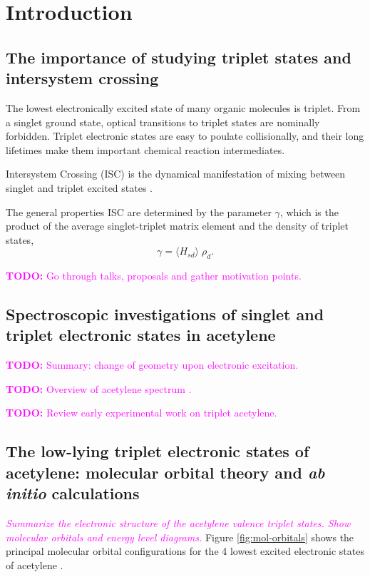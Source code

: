 \documentclass[12pt]{mitthesis}
\newcommand{\TODO} [1]{\textcolor{magenta}{\textbf{TODO:} #1}}
\newcommand{\POINT}[1]{\textcolor{magenta}{\emph{#1}}}
\begin{document}
\tableofcontents
\clearpage

\chapter{Introduction}
\label{chapter:intro}

\section{The importance of studying triplet states and intersystem
  crossing}

The lowest electronically excited state of many organic molecules is
triplet.  From a singlet ground state, optical transitions to triplet
states are nominally forbidden.  Triplet electronic states are easy to
poulate collisionally, and their long lifetimes make them important
chemical reaction intermediates.

Intersystem Crossing (ISC) is the dynamical manifestation of mixing
between singlet and triplet excited states \cite{kommandeur87,
  robinson67, tramer05}.

The general properties ISC are determined by the parameter $\gamma$,
which is the product of the average singlet-triplet matrix element and
the density of triplet states,
\begin{equation}
\gamma = \langle H_{sd} \rangle \; \rho_d.
\end{equation}

\TODO{Go through talks, proposals and gather motivation points.}

\section{Spectroscopic investigations of singlet and
  triplet electronic states in acetylene}

\TODO{Summary: change of geometry upon electronic excitation.}

\TODO{Overview of acetylene spectrum \cite{watson82}.}

\TODO{Review early experimental work on triplet acetylene.}

\section{The low-lying triplet electronic states of acetylene:
  molecular orbital theory and \emph{ab initio} calculations}

\POINT{Summarize the electronic structure of the acetylene valence
  triplet states.  Show molecular orbitals and energy level diagrams.}
Figure \ref{fig:mol-orbitals} shows the principal molecular orbital
configurations for the 4 lowest excited electronic states of
acetylene \cite{yamaguchi93}.
\end{document}

